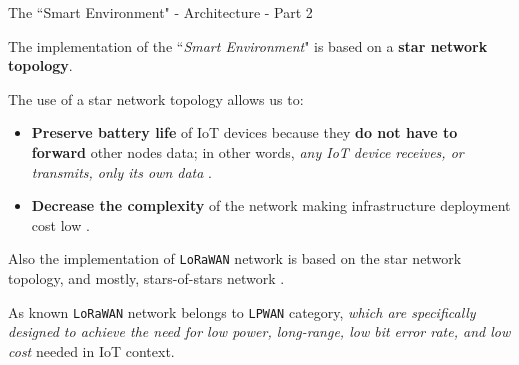\documentclass[10pt]{beamer}
\begin{document}
\begin{frame}{The ``Smart Environment" - Architecture - Part 2}

\begin{block}{}
The implementation of the ``\textit{Smart Environment}" is based on a \textbf{star network topology}.
\end{block}

The use of a star network topology allows us to:

\begin{itemize}
\justifying
\item \textbf{Preserve battery life} of IoT devices because they \textbf{do not have to forward} other nodes data; in other words, \textit{any IoT device receives, or transmits, only its own data} \cite{LoRaWAN}.

\item \textbf{Decrease the complexity} of the network \cite{LoRaWAN} making infrastructure deployment cost low \cite{nokia}.

\end{itemize}

\begin{block}{}
\justifying
Also the implementation of \texttt{LoRaWAN} network is based on the star network topology, and mostly, stars-of-stars network \cite{LoRaWAN}. 

As known \texttt{LoRaWAN} network belongs to \texttt{LPWAN} category, \textit{which are specifically designed to achieve the need for low power, long-range, low bit error rate, and low cost} needed in IoT context. 
\end{block}

\end{frame} 
\end{document}
